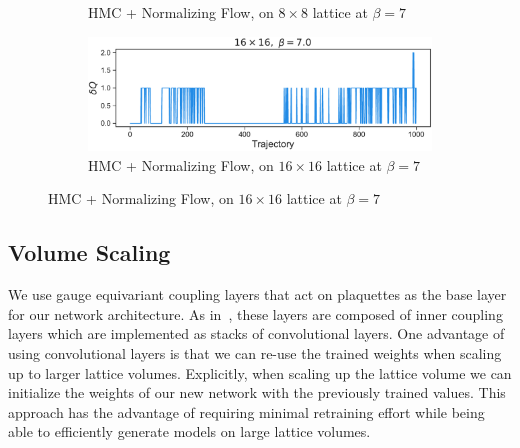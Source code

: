 \documentclass[a4paper,11pt]{article}
\begin{document}
\begin{figure}[htpb]
\begin{subfigure}[b]{0.49\textwidth}
        \caption{\label{subfig:dqftHMC8}HMC + Normalizing Flow, on \(8 \times
        8\) lattice at \(\beta = 7\)}
    \end{subfigure}
    \hfill
    \begin{subfigure}[b]{0.49\textwidth}
        \includegraphics[width=\textwidth]{assets/dqftHMC_16x16_beta7.pdf}
        \caption{\label{subfig:dqftHMC16}HMC + Normalizing Flow, on
        \(16 \times 16\) lattice at \(\beta = 7\)}
    \end{subfigure}
\end{figure}
%
\subsection{\label{subsec:volume_scaling}Volume Scaling}
%
We use gauge equivariant coupling layers that act on plaquettes as the
base layer for our network architecture.
%
As in~\cite{Albergo:2021vyo}, these layers are composed of inner coupling
layers which are implemented as stacks of convolutional layers.
%
One advantage of using convolutional layers is that we can re-use the trained
weights when scaling up to larger lattice volumes.
%
Explicitly, when scaling up the lattice volume we can initialize the weights
of our new network with the previously trained values.
%
This approach has the advantage of requiring minimal retraining effort while
being able to efficiently generate models on large lattice volumes.






\end{document}
